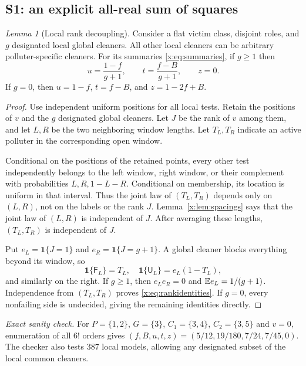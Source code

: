 \documentclass[11pt,a4paper]{article}
\theoremstyle{definition}\newtheorem{definition}[theorem]{Definition}
\theoremstyle{remark}\newtheorem{remark}[theorem]{Remark}
\newcommand{\ind}{\mathbf 1}
\newtheorem{xlemma}[xtheorem]{Lemma}
\theoremstyle{definition}\newtheorem{xexample}[xtheorem]{Example}\theoremstyle{plain}
\providecommand{\ind}{\mathbf 1}
\newcommand{\Fail}{\mathsf F}\newcommand{\Clean}{\mathsf C}\newcommand{\Und}{\mathsf U}
\newcommand{\xcheck}[1]{\par\smallskip\textit{Exact sanity check.} #1\par}
\begin{document}
\subsection{S1: an explicit all-real sum of squares}

\begin{xlemma}[Local rank decoupling]\label{x:lem:rank}
Consider a flat victim class, disjoint roles, and $g$ designated local global cleaners. All other local cleaners can be arbitrary polluter-specific cleaners. For its summaries \eqref{x:eq:summaries}, if $g\ge1$ then
\begin{equation}\label{x:eq:rankidentities}
u=\frac{1-f}{g+1},\qquad t=\frac{f-B}{g+1},\qquad z=0.
\end{equation}
If $g=0$, then $u=1-f$, $t=f-B$, and $z=1-2f+B$.
\end{xlemma}
\begin{proof}
Use independent uniform positions for all local tests. Retain the positions of $v$ and the $g$ designated global cleaners. Let $J$ be the rank of $v$ among them, and let $L,R$ be the two neighboring window lengths. Let $T_L,T_R$ indicate an active polluter in the corresponding open window.

Conditional on the positions of the retained points, every other test independently belongs to the left window, right window, or their complement with probabilities $L,R,1-L-R$. Conditional on membership, its location is uniform in that interval. Thus the joint law of $(T_L,T_R)$ depends only on $(L,R)$, not on the labels or the rank $J$. Lemma~\ref{x:lem:spacings} says that the joint law of $(L,R)$ is independent of $J$. After averaging these lengths, $(T_L,T_R)$ is independent of $J$.

Put $e_L=\ind\{J=1\}$ and $e_R=\ind\{J=g+1\}$. A global cleaner blocks everything beyond its window, so
\[
\ind\{\Fail_L\}=T_L,\quad
\ind\{\Und_L\}=e_L(1-T_L),
\]
and similarly on the right. If $g\ge1$, then $e_Le_R=0$ and $\mathbb E e_L=1/(g+1)$. Independence from $(T_L,T_R)$ proves \eqref{x:eq:rankidentities}. If $g=0$, every nonfailing side is undecided, giving the remaining identities directly.
\end{proof}
\xcheck{For $P=\{1,2\}$, $G=\{3\}$, $C_1=\{3,4\}$, $C_2=\{3,5\}$ and $v=0$, enumeration of all $6!$ orders gives $(f,B,u,t,z)=(5/12,19/180,7/24,7/45,0)$. The checker also tests 387 local models, allowing any designated subset of the local common cleaners.}
\end{document}
